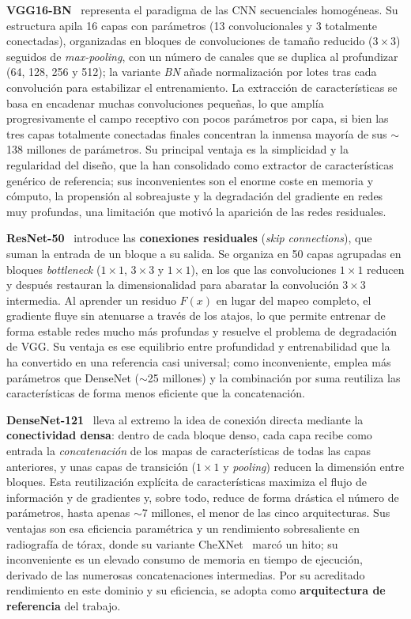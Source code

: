 \textbf{VGG16-BN}~\cite{simonyanVeryDeepConvolutional2015} representa el paradigma de las
CNN secuenciales homogéneas. Su estructura apila 16 capas con parámetros (13
convolucionales y 3 totalmente conectadas), organizadas en bloques de convoluciones de
tamaño reducido ($3\times3$) seguidos de \textit{max-pooling}, con un número de canales
que se duplica al profundizar (64, 128, 256 y 512); la variante \textit{BN} añade
normalización por lotes tras cada convolución para estabilizar el entrenamiento. La
extracción de características se basa en encadenar muchas convoluciones pequeñas, lo que
amplía progresivamente el campo receptivo con pocos parámetros por capa, si bien las tres
capas totalmente conectadas finales concentran la inmensa mayoría de sus $\sim$138
millones de parámetros. Su principal ventaja es la simplicidad y la regularidad del
diseño, que la han consolidado como extractor de características genérico de referencia;
sus inconvenientes son el enorme coste en memoria y cómputo, la propensión al sobreajuste
y la degradación del gradiente en redes muy profundas, una limitación que motivó la
aparición de las redes residuales.

\textbf{ResNet-50}~\cite{heDeepResidualLearning2016} introduce las \textbf{conexiones
residuales} (\textit{skip connections}), que suman la entrada de un bloque a su salida.
Se organiza en 50 capas agrupadas en bloques \textit{bottleneck} ($1\times1$, $3\times3$
y $1\times1$), en los que las convoluciones $1\times1$ reducen y después restauran la
dimensionalidad para abaratar la convolución $3\times3$ intermedia. Al aprender un
residuo $F(x)$ en lugar del mapeo completo, el gradiente fluye sin atenuarse a través de
los atajos, lo que permite entrenar de forma estable redes mucho más profundas y resuelve
el problema de degradación de VGG. Su ventaja es ese equilibrio entre profundidad y
entrenabilidad que la ha convertido en una referencia casi universal; como inconveniente,
emplea más parámetros que DenseNet ($\sim$25 millones) y la combinación por suma reutiliza
las características de forma menos eficiente que la concatenación.

\textbf{DenseNet-121}~\cite{huangDenselyConnectedConvolutional2017} lleva al extremo la
idea de conexión directa mediante la \textbf{conectividad densa}: dentro de cada bloque
denso, cada capa recibe como entrada la \textit{concatenación} de los mapas de
características de todas las capas anteriores, y unas capas de transición ($1\times1$ y
\textit{pooling}) reducen la dimensión entre bloques. Esta reutilización explícita de
características maximiza el flujo de información y de gradientes y, sobre todo, reduce de
forma drástica el número de parámetros, hasta apenas $\sim$7 millones, el menor de las
cinco arquitecturas. Sus ventajas son esa eficiencia paramétrica y un rendimiento
sobresaliente en radiografía de tórax, donde su variante CheXNet~\cite{rajpurkarCheXNetRadiologistLevel2017}
marcó un hito; su inconveniente es un elevado consumo de memoria en tiempo de ejecución,
derivado de las numerosas concatenaciones intermedias. Por su acreditado rendimiento en
este dominio y su eficiencia, se adopta como \textbf{arquitectura de referencia} del
trabajo.

